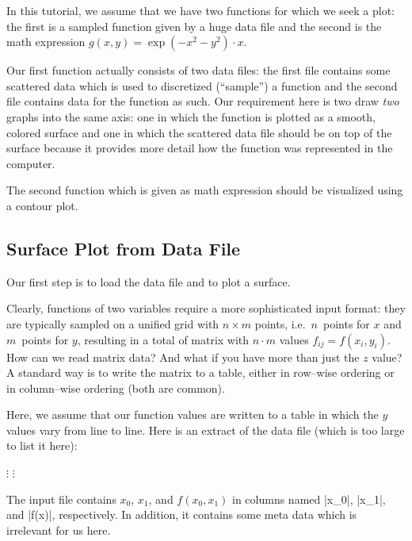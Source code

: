 
In this tutorial, we assume that we have two functions for which we seek a plot: the first is a sampled function given by a huge data file and the second is the math expression $g(x,y)=\exp(-x^2-y^2)\cdot x$. 

Our first function actually consists of two data files: the first file contains some scattered data which is used to discretized (``sample'') a function and the second file contains data for the function as such. 
Our requirement here is two draw \emph{two} graphs into the same axis: one in which the function is plotted as a smooth, colored surface and one in which the scattered data file should be on top of the surface because it provides more detail how the function was represented in the computer. 

The second function which is given as math expression should be visualized using a contour plot. 


\subsection{Surface Plot from Data File}
Our first step is to load the data file and to plot a surface. 

Clearly, functions of two variables require a more sophisticated input format: they are typically sampled on a unified grid with $n \times m$ points, i.e.\ $n$~points for $x$ and $m$~points for $y$, resulting in a total of matrix with $n\cdot m$ values $f_{ij} = f(x_i,y_i)$. How can we read matrix data? And what if you have more than just the $z$ value? A standard way is to write the matrix to a table, either in row--wise ordering or in column--wise ordering (both are common). 

Here, we assume that our function values are written to a table in which the $y$ values vary from line to line. Here is an extract of the data file (which is too large to list it here):

    \baselineskip
    $\vdots$
    \baselineskip
    \baselineskip
    $\vdots$

The input file contains $x_0$, $x_1$, and $f(x_0,x_1)$ in columns named |x_0|, |x_1|, and |f(x)|, respectively. In addition, it contains some meta data which is irrelevant for us here.

